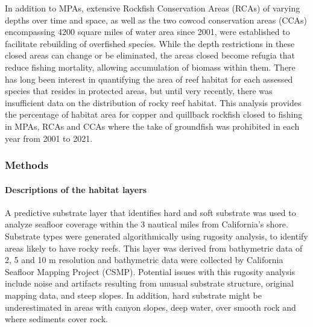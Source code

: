 \documentclass[11pt,
  english,
  a4paper,
]{article}
\begin{document}
\leavevmode\tagmcend\tagstructend\par


In addition to MPAs, extensive Rockfish Conservation Areas (RCAs) of varying depths over time and space, as well as the two cowcod conservation areas (CCAs) encompassing 4200 square miles of water area since 2001, were established to facilitate rebuilding of overfished species. While the depth restrictions in these closed areas can change or be eliminated, the areas closed become refugia that reduce fishing mortality, allowing accumulation of biomass within them. There has long been interest in quantifying the area of reef habitat for each assessed species that resides in protected areas, but until very recently, there was insufficient data on the distribution of rocky reef habitat. This analysis provides the percentage of habitat area for copper and quillback rockfish closed to fishing in MPAs, RCAs and CCAs where the take of groundfish was prohibited in each year from 2001 to 2021.

\leavevmode\tagmcend\tagstructend\par


\hypertarget{methods}{%
\subsubsection{Methods}\label{methods}}

\leavevmode\tagmcend\tagstructend


\hypertarget{descriptions-of-the-habitat-layers}{%
\paragraph{Descriptions of the habitat layers}\label{descriptions-of-the-habitat-layers}}

\leavevmode\tagmcend\tagstructend


A predictive substrate layer that identifies hard and soft substrate was used to analyze seafloor coverage within the 3 nautical miles from California's shore. Substrate types were generated algorithmically using rugosity analysis, to identify areas likely to have rocky reefs. This layer was derived from bathymetric data of 2, 5 and 10 m resolution and bathymetric data were collected by California Seafloor Mapping Project (CSMP). Potential issues with this rugosity analysis include noise and artifacts resulting from unusual substrate structure, original mapping data, and steep slopes. In addition, hard substrate might be underestimated in areas with canyon slopes, deep water, over smooth rock and where sediments cover rock.
\end{document}
